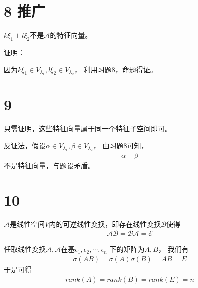 \documentclass{article}
\begin{document}
\section*{8 推广}

$k \xi_1 + l \xi_2$不是$\mathscr{A}$的特征向量。

证明：

因为$k \xi_1 \in V_{\lambda_1}, l \xi_2 \in V_{\lambda_2}$，
利用习题8，命题得证。

\section*{9}

只需证明，这些特征向量属于同一个特征子空间即可。

反证法，假设$\alpha \in V_{\lambda_1}, \beta \in V_{\lambda_2}$，
由习题8可知，
\begin{align*}
  \alpha + \beta
\end{align*}
不是特征向量，与题设矛盾。

\section*{10}

$\mathscr{A}$是线性空间$V$内的可逆线性变换，即存在线性变换$\mathscr{B}$使得
\begin{align*}
  \mathscr{A} \mathscr{B} = \mathscr{B} \mathscr{A} = \mathscr{E}
\end{align*}

任取线性变换$\mathscr{A}, \mathscr{A}$在基$\epsilon_1, \epsilon_2, \cdots, \epsilon_n$
下的矩阵为$A, B$，
我们有
\begin{align*}
  \sigma(AB) = \sigma(A) \sigma(B) = AB = E
\end{align*}
于是可得
\begin{align*}
  rank(A) = rank(B) = rank(E) = n
\end{align*}
\end{document}
